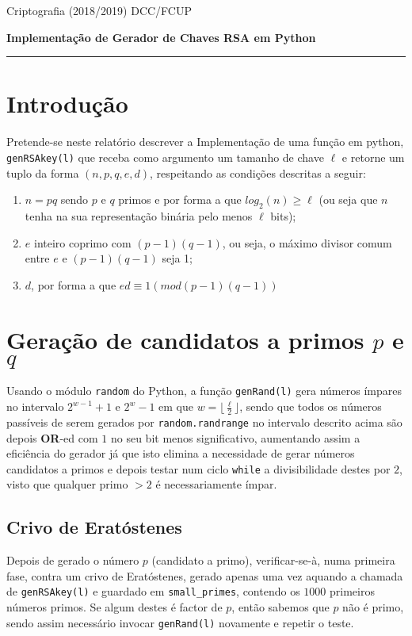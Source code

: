 \documentclass[dvipsnames]{article}
\begin{document}
\noindent Criptografia (2018/2019)
\hfill DCC/FCUP

\begin{center}\LARGE\bf 
  Implementação de Gerador de Chaves RSA em Python \\
\end{center}

\vskip 0.4cm
\hrule
\vskip 0.4cm

\section{Introdução}
Pretende-se neste relatório descrever a Implementação de uma função em python, \texttt{genRSAkey(l)} que receba como argumento um tamanho de chave $\ell$ e retorne um tuplo da forma $(n,p,q,e,d)$, respeitando as condições descritas a seguir:
\begin{enumerate}
  \item $n=pq$ sendo $p$ e $q$ primos e por forma a que $log_2(n) \geq \ell$ (ou seja que $n$ tenha na sua representação binária pelo menos $\ell$ bits);
  \item $e$ inteiro coprimo com $(p-1)(q-1)$, ou seja, o máximo divisor comum entre $e$ e $(p-1)(q-1)$ seja 1;
  \item $d$, por forma a que $ed \equiv 1 (mod (p-1)(q-1))$
\end{enumerate}

\section{Geração de candidatos a primos $p$ e $q$}
Usando o módulo \texttt{random} do Python, a função \texttt{genRand(l)} gera números ímpares no intervalo $2^{w-1} + 1$ e $2^{w} - 1$ em que $w=\lfloor \frac{\ell}{2} \rfloor$, sendo que todos os números passíveis de serem gerados por \texttt{random.randrange} no intervalo descrito acima são depois \textbf{OR}-ed com $1$ no seu bit menos significativo, aumentando assim a eficiência do gerador já que isto elimina a necessidade de gerar números candidatos a primos e depois testar num ciclo \texttt{while} a divisibilidade destes por $2$, visto que qualquer primo $>2$ é necessariamente ímpar.

\vskip 0.4cm

\subsection{Crivo de Eratóstenes}

Depois de gerado o número $p$ (candidato a primo), verificar-se-à, numa primeira fase, contra um crivo de Eratóstenes, gerado apenas uma vez aquando a chamada de \texttt{genRSAkey(l)} e guardado em \texttt{small\_primes}, contendo os $1000$ primeiros números primos. Se algum destes é factor de $p$, então sabemos que $p$ não é primo, sendo assim necessário invocar \texttt{genRand(l)} novamente e repetir o teste.
\end{document}
